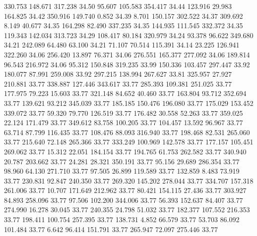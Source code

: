  330.753  148.671  317.238        34.50
  95.607  105.583  354.417        34.44
 123.916   29.983  164.825        34.42
 350.916  149.740    0.852        34.39
   8.701  150.157  302.522        34.37
 309.692    8.149   40.677        34.35
 164.298   82.490  337.235        34.35
 144.935  111.545  332.372        34.35
 119.343  142.034  313.723        34.29
 108.417   80.184  320.979        34.24
  93.378   96.622  349.680        34.21
 242.089   64.480   63.100        34.21
  71.107   70.514  115.391        34.14
  23.225  126.941  322.260        34.06
 256.420   13.897   76.371        34.06
 276.551  165.377  277.092        34.06
 189.814   96.543  216.972        34.06
  95.312  150.848  319.235        33.99
 150.336  103.457  297.447        33.92
 180.077   87.991  259.008        33.92
 297.215  138.994  267.627        33.81
 325.957   27.927  210.881        33.77
 338.887  127.446  343.617        33.77
 285.393  109.381  251.025        33.77
 177.975   79.223   15.603        33.77
 321.148   84.652   40.460        33.77
 163.804   93.712  352.694        33.77
 139.621   93.212  345.039        33.77
 185.185  150.476  196.080        33.77
 175.029  153.452  339.072        33.77
  59.320   79.770  126.519        33.77
 176.482   30.558   52.263        33.77
 359.025   22.124  171.479        33.77
 349.612   83.758  100.205        33.77
 104.457   13.592   96.967        33.77
  63.714   87.799  116.435        33.77
 108.476   88.093  316.940        33.77
 198.468   82.531  265.060        33.77
 215.640   72.148  265.366        33.77
 333.249  100.969  142.578        33.77
 177.157  105.451  269.062        33.77
  15.312   22.051  184.154        33.77
 194.765   61.753  262.582        33.77
 340.940   20.787  203.662        33.77
  24.281   28.321  350.191        33.77
  95.156   29.689  286.354        33.77
  98.960   64.130  271.710        33.77
  97.505   26.899  119.589        33.77
 132.859    8.483   73.919        33.77
 230.831   92.847  240.350        33.77
 269.320  145.202  278.044        33.77
 334.707  157.318  261.006        33.77
  10.707  171.649  212.962        33.77
  80.421  154.115   27.436        33.77
 303.927   84.893  258.096        33.77
  97.506  102.200  344.006        33.77
  56.393  152.637   84.407        33.77
 274.990   16.278   30.045        33.77
 240.355   24.798   51.032        33.77
 182.377  107.552  216.353        33.77
 198.411  100.754  257.395        33.77
 138.731    4.852   66.579        33.77
  53.703   86.092  101.484        33.77
   6.642   96.414  151.791        33.77
 265.947   72.097  275.446        33.77

